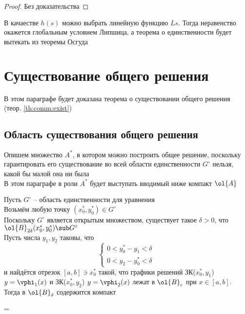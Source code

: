 \begin{proof}
	Без доказательства
\end{proof}

\begin{remark}
    В качаестве $ h(s) $ можно выбрать линейную функцию $ Ls $. Тогда неравенство  окажется глобальным условием Липшица, а теорема о единственности будет вытекать из теоремы Осгуда
\end{remark}

\section{Существование общего решения}

В этом параграфе будет доказана теорема о существовании общего решения (теор. \ref{th:comm:exist})

\subsection{Область существования общего решения}

Опишем множество $ A^* $, в котором можно построить общее решение, поскольку гарантировать его существование во всей области единственности $ G^\circ $ нельзя, какой бы малой она ни была \\
В этом параграфе в роли $ A^* $ будет выступать вводимый ниже компакт $ \ol{A} $

\begin{algorithm}[построения $ \ol{A} $]
    Пусть $ G^\circ $ -- область единственности для уравнения  \\
    Возьмём любую точку $ (x_0^*, y_0^*) \in G^\circ $ \\
    Поскольку $ G^\circ $ является открытым множеством, существует такое $ \delta > 0 $, что $ \ol{B}_{2\delta}(x_0^*, y_0^*) \sub G^\circ $ \\
    Пусть числа $ y_1, y_2 $ таковы, что
    $$
    \begin{cases}
    	0 < y_0^* - y_1 < \delta \\
        0 < y_2 - y_0^* < \delta
    \end{cases} $$
    и найдётся отрезок $ [a, b] \ni x_0^* $ такой, что графики решений ЗК($ x_0^*, y_1 $) $ y = \vphi_1(x) $ и ЗК($ x_0^*, y_2 $) $ y = \vphi_2(x) $ лежат в $ \ol{B}_c $ при $ x \in [a, b] $. Тогда в $ \ol{B}_\delta $ содержится компакт
    \begin{equ}{1.25}
         = 
    \end{equ}
\end{algorithm}

